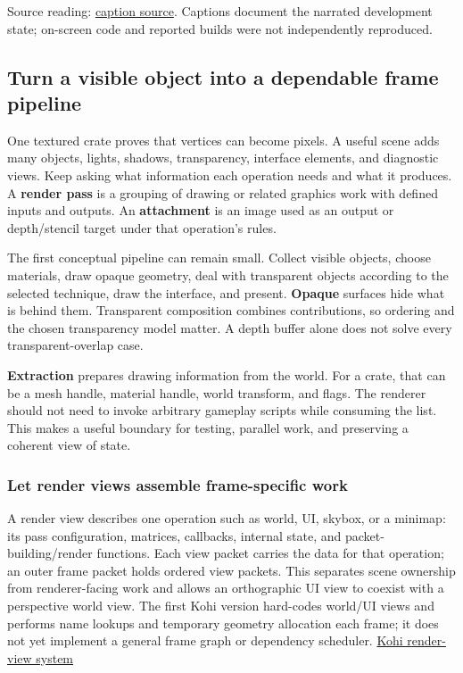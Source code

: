 Source reading: \href{https://www.youtube.com/watch?v=IolJ9Zt57uE}{caption source}. Captions document the narrated development state; on-screen code and reported builds were not independently reproduced.

\subsection{Turn a visible object into a dependable frame pipeline}\label{06-engine-ii-ch026-turn-a-visible-object-into-a-dependable-frame-pipeline}

One textured crate proves that vertices can become pixels. A useful scene adds many objects, lights, shadows, transparency, interface elements, and diagnostic views. Keep asking what information each operation needs and what it produces. A \textbf{render pass} is a grouping of drawing or related graphics work with defined inputs and outputs. An \textbf{attachment} is an image used as an output or depth/stencil target under that operation's rules.

The first conceptual pipeline can remain small. Collect visible objects, choose materials, draw opaque geometry, deal with transparent objects according to the selected technique, draw the interface, and present. \textbf{Opaque} surfaces hide what is behind them. Transparent composition combines contributions, so ordering and the chosen transparency model matter. A depth buffer alone does not solve every transparent-overlap case.

\textbf{Extraction} prepares drawing information from the world. For a crate, that can be a mesh handle, material handle, world transform, and flags. The renderer should not need to invoke arbitrary gameplay scripts while consuming the list. This makes a useful boundary for testing, parallel work, and preserving a coherent view of state.

\subsubsection{Let render views assemble frame-specific work}\label{06-engine-ii-ch026-let-render-views-assemble-frame-specific-work}

A render view describes one operation such as world, UI, skybox, or a minimap: its pass configuration, matrices, callbacks, internal state, and packet-building/render functions. Each view packet carries the data for that operation; an outer frame packet holds ordered view packets. This separates scene ownership from renderer-facing work and allows an orthographic UI view to coexist with a perspective world view. The first Kohi version hard-codes world/UI views and performs name lookups and temporary geometry allocation each frame; it does not yet implement a general frame graph or dependency scheduler. \href{https://www.youtube.com/watch?v=f8fx0HB6GgY}{Kohi render-view system}

